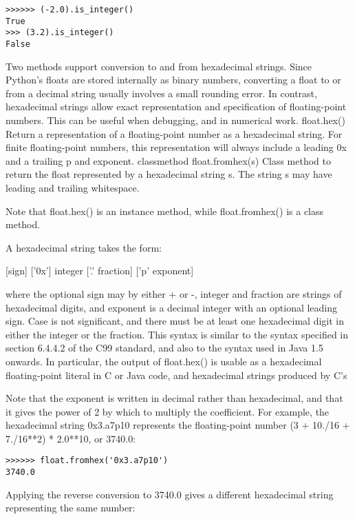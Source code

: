 \begin{lstlisting}
>>>>>> (-2.0).is_integer()
True
>>> (3.2).is_integer()
False
\end{lstlisting}

Two methods support conversion to and from hexadecimal strings. Since Python’s floats are stored internally as binary numbers, converting a float to or from a decimal string usually involves a small rounding error. In contrast, hexadecimal strings allow exact representation and specification of floating-point numbers. This can be useful when debugging, and in numerical work.
float.hex()
Return a representation of a floating-point number as a hexadecimal string. For finite floating-point numbers, this representation will always include a leading 0x and a trailing p and exponent.
classmethod float.fromhex(s)
Class method to return the float represented by a hexadecimal string s. The string s may have leading and trailing whitespace.

Note that float.hex() is an instance method, while float.fromhex() is a class method.

A hexadecimal string takes the form:


[sign] ['0x'] integer ['.' fraction] ['p' exponent]


where the optional sign may by either + or -, integer and fraction are strings of hexadecimal digits, and exponent is a decimal integer with an optional leading sign. Case is not significant, and there must be at least one hexadecimal digit in either the integer or the fraction. This syntax is similar to the syntax specified in section 6.4.4.2 of the C99 standard, and also to the syntax used in Java 1.5 onwards. In particular, the output of float.hex() is usable as a hexadecimal floating-point literal in C or Java code, and hexadecimal strings produced by C’s %

Note that the exponent is written in decimal rather than hexadecimal, and that it gives the power of 2 by which to multiply the coefficient. For example, the hexadecimal string 0x3.a7p10 represents the floating-point number (3 + 10./16 + 7./16**2) * 2.0**10, or 3740.0:

\begin{lstlisting}
>>>>>> float.fromhex('0x3.a7p10')
3740.0
\end{lstlisting}

Applying the reverse conversion to 3740.0 gives a different hexadecimal string representing the same number:

